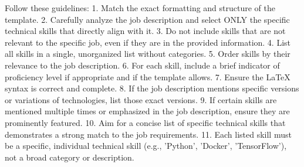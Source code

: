     Follow these guidelines:
    1. Match the exact formatting and structure of the template.
    2. Carefully analyze the job description and select ONLY the specific technical skills that directly align with it.
    3. Do not include skills that are not relevant to the specific job, even if they are in the provided information.
    4. List all skills in a single, unorganized list without categories.
    5. Order skills by their relevance to the job description.
    6. For each skill, include a brief indicator of proficiency level if appropriate and if the template allows.
    7. Ensure the LaTeX syntax is correct and complete.
    8. If the job description mentions specific versions or variations of technologies, list those exact versions.
    9. If certain skills are mentioned multiple times or emphasized in the job description, ensure they are prominently featured.
    10. Aim for a concise list of specific technical skills that demonstrates a strong match to the job requirements.
    11. Each listed skill must be a specific, individual technical skill (e.g., 'Python', 'Docker', 'TensorFlow'), not a broad category or description.
    